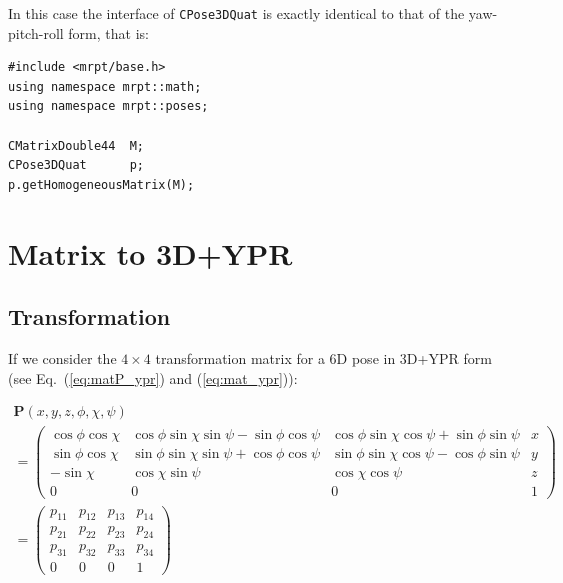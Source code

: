 \documentclass[a4paper,10pt]{report}
\begin{document}
In this case the interface of \texttt{CPose3DQuat} is exactly identical to that 
of the yaw-pitch-roll form, that is:

\begin{lstlisting}
#include <mrpt/base.h> 
using namespace mrpt::math; 
using namespace mrpt::poses; 

CMatrixDouble44  M;
CPose3DQuat      p;
p.getHomogeneousMatrix(M);
\end{lstlisting}




\section{Matrix to 3D+YPR   }
\label{sect:mat2ypr}

\subsection{Transformation}

If we consider the $4 \times 4$ transformation matrix for 
a 6D pose in 3D+YPR form (see Eq.~(\ref{eq:matP_ypr}) and (\ref{eq:mat_ypr})):

\begin{equation*}
\begin{array}{l}
\mathbf{P}(x,y,z,\phi,\chi,\psi)  \\
=\left(
  \begin{array}{ccc|c}
   \cos \phi \cos \chi  & \cos \phi \sin \chi \sin \psi - \sin \phi \cos \psi   & \cos \phi \sin \chi \cos \psi + \sin \phi \sin \psi & x \\
   \sin \phi \cos \chi  & \sin \phi \sin \chi \sin \psi + \cos \phi \cos \psi  &  \sin \phi \sin \chi \cos \psi - \cos \phi \sin \psi & y \\
   -\sin \chi & \cos \chi \sin \psi  &  \cos \chi \cos \psi & z \\ \hline
   0 & 0 & 0& 1
  \end{array}
\right) \\
=\left(
  \begin{array}{ccc|c}
   p_{11} & p_{12}& p_{13}& p_{14} \\
   p_{21} & p_{22}& p_{23}& p_{24} \\
   p_{31} & p_{32}& p_{33}& p_{34} \\
   0 & 0 & 0& 1
  \end{array}
\right)
\end{array}
\end{equation*}
\end{document}
